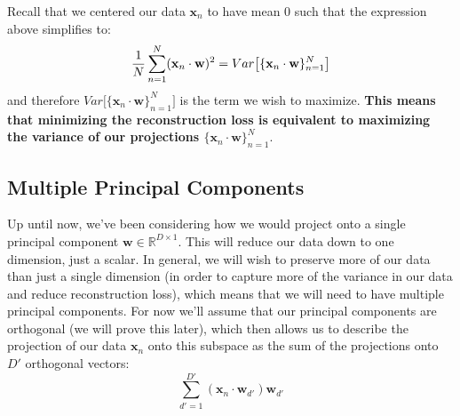 Recall that we centered our data $\textbf{x}_{n}$ to have mean 0 such that the expression above simplifies to:
\begin{equation} \label{variance-equivalence}
    \frac{1}{N} \sum_{n=1}^{N} (\textbf{x}_{n} \cdot \textbf{w})^{2} = Var\big[\{\textbf{x}_{n} \cdot \textbf{w}\}_{n=1}^{N}\big] \\
\end{equation}
and therefore $Var\big[\{\textbf{x}_{n} \cdot \textbf{w}\}_{n=1}^{N}\big]$ is the term we wish to maximize. \textbf{This means that minimizing the reconstruction loss is equivalent to maximizing the variance of our projections $\{\textbf{x}_{n} \cdot \textbf{w}\}_{n=1}^{N}$}.


\subsection{Multiple Principal Components}
Up until now, we've been considering how we would project onto a single principal component $\textbf{w} \in \mathbb{R}^{D \times 1}$. This will reduce our data down to one dimension, just a scalar. In general, we will wish to preserve more of our data than just a single dimension (in order to capture more of the variance in our data and reduce reconstruction loss), which means that we will need to have multiple principal components. For now we'll assume that our principal components are orthogonal (we will prove this later), which then allows us to describe the projection of our data $\textbf{x}_{n}$ onto this subspace as the sum of the projections onto $D'$ orthogonal vectors:
\begin{equation} \label{orthogonal-projections}
    \sum_{d'=1}^{D'} (\textbf{x}_{n} \cdot \textbf{w}_{d'})\textbf{w}_{d'}
\end{equation}

